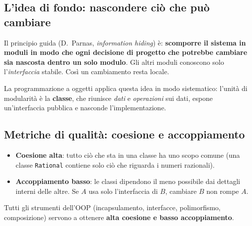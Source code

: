 \subsection{L'idea di fondo: nascondere ciò che può cambiare}
Il principio guida (D.~Parnas, \emph{information hiding}) è: \textbf{scomporre il sistema in moduli in modo che ogni decisione di progetto che potrebbe cambiare sia nascosta dentro un solo modulo}. Gli altri moduli conoscono solo l'\emph{interfaccia} stabile. Così un cambiamento resta locale.

La programmazione a oggetti applica questa idea in modo sistematico: l'unità di modularità è la \textbf{classe}, che riunisce \emph{dati} e \emph{operazioni} sui dati, espone un'interfaccia pubblica e nasconde l'implementazione.

\subsection{Metriche di qualità: coesione e accoppiamento}
\begin{itemize}
    \item \textbf{Coesione alta}: tutto ciò che sta in una classe ha uno scopo comune (una classe \texttt{Rational} contiene solo ciò che riguarda i numeri razionali).
    \item \textbf{Accoppiamento basso}: le classi dipendono il meno possibile dai dettagli interni delle altre. Se $A$ usa solo l'interfaccia di $B$, cambiare $B$ non rompe $A$.
\end{itemize}
Tutti gli strumenti dell'OOP (incapsulamento, interfacce, polimorfismo, composizione) servono a ottenere \textbf{alta coesione e basso accoppiamento}.

